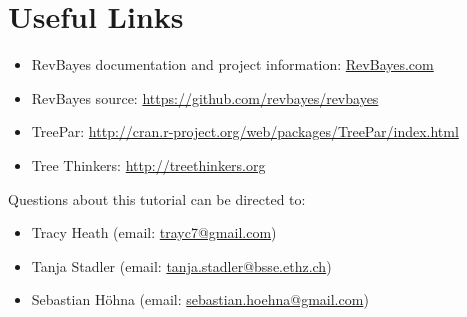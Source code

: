 
\bigskip
\section*{Useful Links}

\begin{itemize}
\item RevBayes documentation and project information: \href{http://www.RevBayes.com}{RevBayes.com} \\ \vspace{-7mm}
\item RevBayes source: \href{https://github.com/revbayes/revbayes}{https://github.com/revbayes/revbayes} \\ \vspace{-7mm}
\item TreePar: \href{http://cran.r-project.org/web/packages/TreePar/index.html}{http://cran.r-project.org/web/packages/TreePar/index.html} \\ \vspace{-7mm}
\item Tree Thinkers: \href{http://treethinkers.org/}{http://treethinkers.org} \\ \vspace{-7mm}
\end{itemize}

Questions about this tutorial can be directed to: \\\vspace{-10mm}
\begin{itemize}
\item Tracy Heath (email: \href{mailto:trayc7@gmail.com}{trayc7@gmail.com}) \\\vspace{-8mm}
\item Tanja Stadler (email: \href{mailto:tanja.stadler@bsse.ethz.ch}{tanja.stadler@bsse.ethz.ch}) \\\vspace{-8mm} 
\item Sebastian H\"{o}hna (email: \href{mailto:sebastian.hoehna@gmail.com}{sebastian.hoehna@gmail.com})
\end{itemize}




